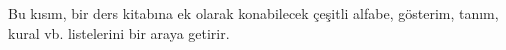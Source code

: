 


\begin{editorial}
  Bu kısım, bir ders kitabına ek olarak konabilecek çeşitli alfabe,
  gösterim, tanım, kural vb. listelerini bir araya getirir.
\end{editorial}



\OLEndPartHook

